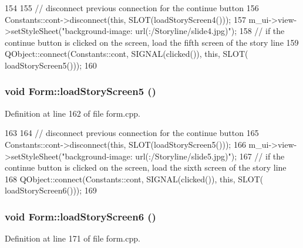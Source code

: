 \begin{DoxyCode}
154 {
155     // disconnect previous connection for the continue button
156     Constants::cont->disconnect(this, SLOT(loadStoryScreen4()));
157     m_ui->view->setStyleSheet("background-image: url(:/Storyline/slide4.jpg)");
158     // if the continue button is clicked on the screen, load the fifth screen of 
      the story line
159     QObject::connect(Constants::cont, SIGNAL(clicked()), this, SLOT(
      loadStoryScreen5()));
160 }
\end{DoxyCode}
\hypertarget{class_form_a13b7e32736d16ff41b5b8d9651db21a6}{
\subsubsection[{loadStoryScreen5}]{\setlength{\rightskip}{0pt plus 5cm}void Form::loadStoryScreen5 ()}}
\label{class_form_a13b7e32736d16ff41b5b8d9651db21a6}


Definition at line 162 of file form.cpp.


\begin{DoxyCode}
163 {
164     // disconnect previous connection for the continue button
165     Constants::cont->disconnect(this, SLOT(loadStoryScreen5()));
166     m_ui->view->setStyleSheet("background-image: url(:/Storyline/slide5.jpg)");
167     // if the continue button is clicked on the screen, load the sixth screen of 
      the story line
168     QObject::connect(Constants::cont, SIGNAL(clicked()), this, SLOT(
      loadStoryScreen6()));
169 }
\end{DoxyCode}
\hypertarget{class_form_aca7f80e793fae48361bdca6c50c967a7}{
\subsubsection[{loadStoryScreen6}]{\setlength{\rightskip}{0pt plus 5cm}void Form::loadStoryScreen6 ()}}
\label{class_form_aca7f80e793fae48361bdca6c50c967a7}


Definition at line 171 of file form.cpp.


